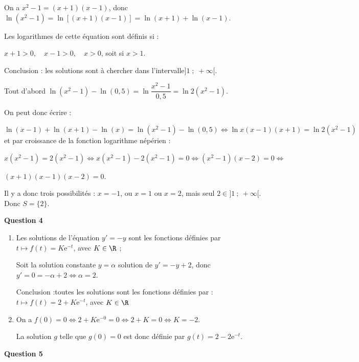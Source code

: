 On a $x^2 - 1 = (x + 1)(x - 1)$, donc $\ln \left(x^2 - 1\right) = \ln [(x + 1)(x - 1)] = \ln (x + 1) + \ln (x - 1)$.

Les logarithmes de cette équation sont définis si :

$x + 1 > 0, \quad x - 1 > 0, \quad x > 0$, soit si $x > 1$.

Conclusion : les solutions sont à chercher dans l'intervalle$]1\;;\; +\infty[$.

Tout d'abord $\ln \left (x^2-1\right ) - \ln\left (0,5\right ) = \ln \dfrac{x^2 - 1}{0,5} = \ln 2\left(x^2 - 1 \right)$.

On peut donc écrire :

$\ln\left (x - 1\right ) + \ln \left (x + 1\right ) - \ln\left (x\right ) = \ln \left (x^2-1\right ) - \ln\left (0,5\right ) \iff \ln x(x - 1)(x + 1) = \ln 2\left(x^2 - 1 \right)$ et par croissance de la fonction logarithme népérien :

$x\left(x^2 - 1\right)= 2\left(x^2 - 1 \right) \iff  x\left(x^2 - 1\right) - 2\left(x^2 - 1 \right) = 0 \iff \left(x^2 - 1\right)(x - 2) = 0 \iff$

$ (x + 1)(x - 1)(x - 2) = 0$.

Il y a donc trois possibilités : $x = - 1$, ou $x = 1$ ou $x = 2$, mais seul $2 \in ]1~;~+ \infty[$. Donc $S = \{2\}$.

\bigskip

\textbf{Question 4}

\medskip

\begin{enumerate}
\item Les solutions de l'équation $y' = - y$ sont les fonctions définies par $t \longmapsto f(t) = K\text{e}^{- t}$, avec $K \in \R$ ;

Soit la solution constante $y = \alpha$ solution de $y'=-y+2$, donc $y' = 0 = - \alpha + 2 \iff \alpha = 2$.

Conclusion :toutes les solutions sont les fonctions définies par : $ t \longmapsto f(t ) =2 + K\text{e}^{- t}$, avec $K \in \R$

\item On a $f(0) = 0 \iff 2 + K\text{e}^{- 0} = 0 \iff 2 + K = 0 \iff K = - 2$.

La solution $g$ telle que $g(0) = 0$ est donc définie par $g(t) = 2 - 2\text{e}^{-t}$. 
\end{enumerate}

\bigskip

\textbf{Question 5}

